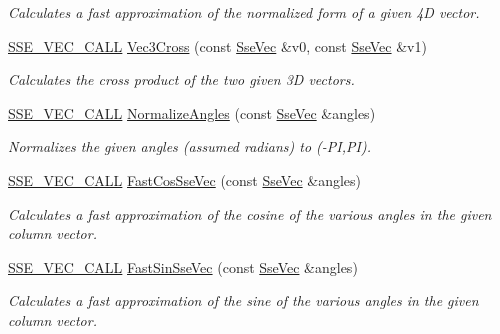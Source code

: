 \begin{DoxyCompactItemize}
\begin{DoxyCompactList}\small\item\em Calculates a fast approximation of the normalized form of a given 4\+D vector. \end{DoxyCompactList}\item 
\hyperlink{ssevec__math__defs_8h_a97454f977a5281455cecacce1e8ba670}{S\+S\+E\+\_\+\+V\+E\+C\+\_\+\+C\+A\+L\+L} \hyperlink{group___s_i_m_d_vec_math_ga12bda9f58865d8d62c5f6aca955bf2d2}{Vec3\+Cross} (const \hyperlink{namespacegofxmath_a634570ddcd2496053ee966227080e02f}{Sse\+Vec} \&v0, const \hyperlink{namespacegofxmath_a634570ddcd2496053ee966227080e02f}{Sse\+Vec} \&v1)
\begin{DoxyCompactList}\small\item\em Calculates the cross product of the two given 3\+D vectors. \end{DoxyCompactList}\item 
\hyperlink{ssevec__math__defs_8h_a97454f977a5281455cecacce1e8ba670}{S\+S\+E\+\_\+\+V\+E\+C\+\_\+\+C\+A\+L\+L} \hyperlink{group___s_i_m_d_vec_math_gad597eb099f2f4e22aec183c593e8facc}{Normalize\+Angles} (const \hyperlink{namespacegofxmath_a634570ddcd2496053ee966227080e02f}{Sse\+Vec} \&angles)
\begin{DoxyCompactList}\small\item\em Normalizes the given angles (assumed radians) to (-\/\+P\+I,P\+I). \end{DoxyCompactList}\item 
\hyperlink{ssevec__math__defs_8h_a97454f977a5281455cecacce1e8ba670}{S\+S\+E\+\_\+\+V\+E\+C\+\_\+\+C\+A\+L\+L} \hyperlink{group___s_i_m_d_vec_math_ga3ef82fc17481b408f903c68e67f2c319}{Fast\+Cos\+Sse\+Vec} (const \hyperlink{namespacegofxmath_a634570ddcd2496053ee966227080e02f}{Sse\+Vec} \&angles)
\begin{DoxyCompactList}\small\item\em Calculates a fast approximation of the cosine of the various angles in the given column vector. \end{DoxyCompactList}\item 
\hyperlink{ssevec__math__defs_8h_a97454f977a5281455cecacce1e8ba670}{S\+S\+E\+\_\+\+V\+E\+C\+\_\+\+C\+A\+L\+L} \hyperlink{group___s_i_m_d_vec_math_ga4ea85c8f8966a02e8917ad45d974244e}{Fast\+Sin\+Sse\+Vec} (const \hyperlink{namespacegofxmath_a634570ddcd2496053ee966227080e02f}{Sse\+Vec} \&angles)
\begin{DoxyCompactList}\small\item\em Calculates a fast approximation of the sine of the various angles in the given column vector. \end{DoxyCompactList}\item 

\end{DoxyCompactItemize}
